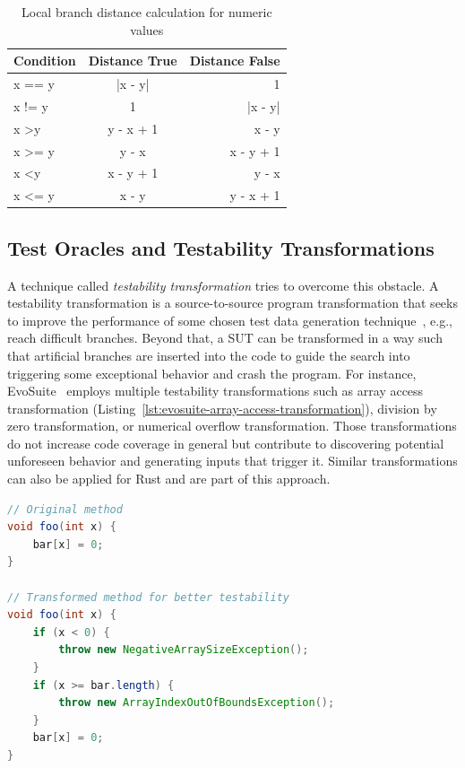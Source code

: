 \documentclass{article}
\begin{document}
\begin{table}[]
\centering
\begin{tabular}{lcr}
\hline
\textbf{Condition}  & \textbf{Distance True} & \textbf{Distance False} \\
\hline
x == y              & |x - y|                & 1                       \\
x != y              & 1                      & |x - y|                 \\
x \textgreater y    & y - x + 1              & x - y                   \\
x \textgreater{}= y & y - x                  & x - y + 1               \\
x \textless y       & x - y + 1              & y - x                   \\
x \textless{}= y    & x - y                  & y - x + 1               \\ \hline
\end{tabular}
\caption{Local branch distance calculation for numeric values}
\label{tab:local-branch-distance-formulas}
\end{table}

\subsection{Test Oracles and Testability Transformations}
\label{sec:testability-transformations}


A technique called \textit{testability transformation} tries to overcome this obstacle. A testability transformation is a source-to-source program transformation that seeks to improve the performance of some chosen test data generation technique~\cite{Harman2004}, e.g., reach difficult branches. Beyond that, a \ac{SUT} can be transformed in a way such that artificial branches are inserted into the code to guide the search into triggering some exceptional behavior and crash the program. For instance, EvoSuite~\cite{Fraser2013} employs multiple testability transformations such as array access transformation (Listing~\ref{lst:evosuite-array-access-transformation}), division by zero transformation, or numerical overflow transformation. Those transformations do not increase code coverage in general but contribute to discovering potential unforeseen behavior and generating inputs that trigger it. Similar transformations can also be applied for Rust and are part of this approach.

\begin{lstlisting}[language=Java, style=boxed, caption={Array access transformation in EvoSuite for Java}, label=lst:evosuite-array-access-transformation]
// Original method
void foo(int x) {
    bar[x] = 0;
}

// Transformed method for better testability
void foo(int x) {
    if (x < 0) {
        throw new NegativeArraySizeException();
    }
    if (x >= bar.length) {
        throw new ArrayIndexOutOfBoundsException();
    }
    bar[x] = 0;
}
\end{lstlisting}
\end{document}
